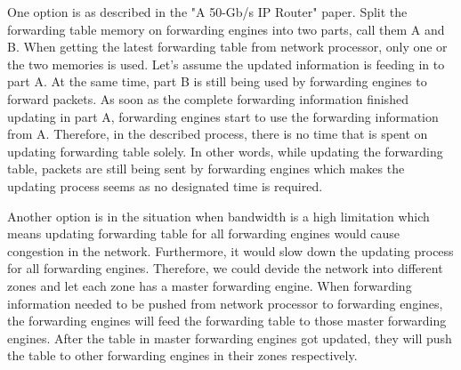 One option is as described in the "A 50-Gb/s IP Router" paper. Split the forwarding table memory on forwarding engines into two parts, call them A and B. When getting the latest forwarding table from network processor, only one or the two memories is used. Let's assume the updated information is feeding in to part A. At the same time, part B is still being used by forwarding engines to forward packets. As soon as the complete forwarding information finished updating in part A, forwarding engines start to use the forwarding information from A. Therefore, in the described process, there is no time that is spent on updating forwarding table solely. In other words, while updating the forwarding table, packets are still being sent by forwarding engines which makes the updating process seems as no designated time is required.

Another option is in the situation when bandwidth is a high limitation which means updating forwarding table for all forwarding engines would cause congestion in the network. Furthermore, it would slow down the updating process for all forwarding engines. Therefore, we could devide the network into different zones and let each zone has a master forwarding engine. When forwarding information needed to be pushed from network processor to forwarding engines, the forwarding engines will feed the forwarding table to those master forwarding engines. After the table in master forwarding engines got updated, they will push the table to other forwarding engines in their zones respectively.








